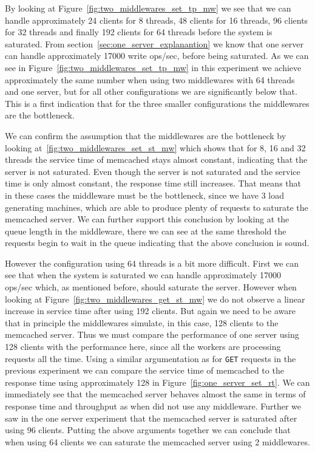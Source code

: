 \documentclass[11pt,a4paper]{article}
\begin{document}
%
By looking at Figure~\ref{fig:two_middlewares_set_tp_mw} we see that we can handle approximately 24 clients for 8 threads, 48 clients for 16 threads, 96 clients for 32 threads and finally 192 clients for 64 threads before the system is saturated.
%
From section~\ref{sec:one_server_explanantion} we know that one server can handle approximately 17000 write ops/sec, before being saturated.
%
As we can see in Figure~\ref{fig:two_middlewares_set_tp_mw} in this experiment we achieve approximately the same number when using two middlewares with 64 threads and one server, but for all other configurations we are significantly below that.
%
This is a first indication that for the three smaller configurations the middlewares are the bottleneck.
%
\par
%
We can confirm the assumption that the middlewares are the bottleneck by looking at~\ref{fig:two_middlewares_set_st_mw} which shows that for 8, 16 and 32 threads the service time of memcached stays almost constant, indicating that the server is not saturated. 
%
Even though the server is not saturated and the service time is only almost constant, the response time still increases.
%
That means that in these cases the middleware must be the bottleneck, since we have 3 load generating machines, which are able to produce plenty of requests to saturate the memcached server.
%
We can further support this conclusion by looking at the queue length in the middleware, there we can see at the same threshold the requests begin to wait in the queue indicating that the above conclusion is sound.
%
\par
%
However the configuration using 64 threads is a bit more difficult.
%
First we can see that when the system is saturated we can handle approximately 17000 ops/sec which, as mentioned before, should saturate the server.
%
However when looking at Figure~\ref{fig:two_middlewares_get_st_mw} we do not observe a linear increase in service time after using 192 clients.
%
But again we need to be aware that in principle the middlewares simulate, in this case, 128 clients to the memcached server.
%
Thus we must compare the performance of one server using 128 clients with the performance here, since all the workers are processing requests all the time.
%
Using a similar argumentation as for \texttt{GET} requests in the previous experiment we can compare the service time of memcached to the response time using approximately 128 in Figure~\ref{fig:one_server_set_rt}.
%
We can immediately see that the memcached server behaves almost the same in terms of response time and throughput as when did not use any middleware.
%
Further we saw in the one server experiment that the memcached server is saturated after using 96 clients.
%
Putting the above arguments together we can conclude that when using 64 clients we can saturate the memcached server using 2 middlewares.
%
\end{document}
